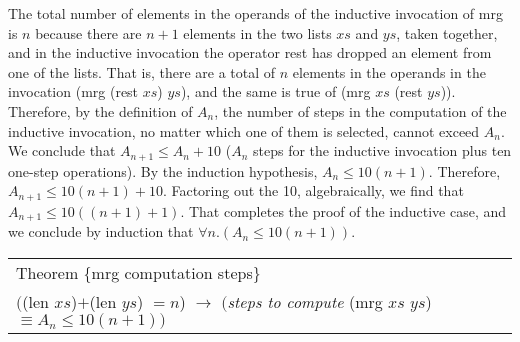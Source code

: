 The total number of elements in the operands
of the inductive invocation of \textsf{mrg}
is $n$ because there are $n+1$ elements in the two lists $xs$ and $ys$,
taken together, and in the inductive invocation the operator \textsf{rest} has
dropped an element from one of the lists.
That is, there are a total of $n$ elements in the operands
in the invocation \textsf{(mrg (rest $xs$) $ys$)},
and the same is true of \textsf{(mrg $xs$ (rest $ys$))}.
Therefore, by the definition of $A_n$,
the number of steps in the computation of the inductive invocation,
no matter which one of them is selected, cannot exceed $A_n$.
We conclude that $A_{n+1} \leq A_n + 10$
($A_n$ steps for the inductive invocation
plus ten one-step operations).
By the induction hypothesis, $A_n \leq 10(n+1)$.
Therefore, $A_{n+1} \leq 10(n+1) + 10$.
Factoring out the 10, algebraically,
we find that $A_{n+1} \leq 10((n+1) + 1)$.
That completes the proof of the inductive case,
and we conclude by induction that $\forall n.(A_n \leq 10(n+1))$.
\label{thm:mrg-computation-time}\label{thm:mrg-steps}
\begin{center}
\begin{tabular}{l}
Theorem \{mrg computation steps\}\\
$($\textsf{(len $xs$)}$+$\textsf{(len $ys$)} $= n$) $\rightarrow$ $($\emph{steps to compute} \textsf{(mrg $xs$ $ys$)} $\equiv A_n \leq 10(n+1))$\\
\end{tabular}
\end{center}

